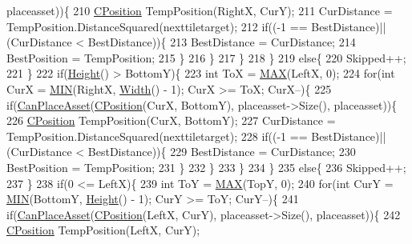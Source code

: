 \begin{DoxyCode}
      placeasset))\{
210                     \hyperlink{classCPosition}{CPosition} TempPosition(RightX, CurY);
211                     CurDistance = TempPosition.DistanceSquared(nexttiletarget);
212                     \textcolor{keywordflow}{if}((-1 == BestDistance)||(CurDistance < BestDistance))\{
213                         BestDistance = CurDistance;
214                         BestPosition = TempPosition;
215                     \}
216                 \}
217             \}
218         \}
219         \textcolor{keywordflow}{else}\{
220             Skipped++;   
221         \}
222         \textcolor{keywordflow}{if}(\hyperlink{classCTerrainMap_ae5e4bf6507e0e3e9ac0322b43eed8a7a}{Height}() > BottomY)\{
223             \textcolor{keywordtype}{int} ToX = \hyperlink{AssetDecoratedMap_8cpp_afa99ec4acc4ecb2dc3c2d05da15d0e3f}{MAX}(LeftX, 0);
224             \textcolor{keywordflow}{for}(\textcolor{keywordtype}{int} CurX = \hyperlink{AssetDecoratedMap_8cpp_a3acffbd305ee72dcd4593c0d8af64a4f}{MIN}(RightX, \hyperlink{classCTerrainMap_a34cb754aa9b26e85a73377159f2527d7}{Width}() - 1); CurX >= ToX; CurX--)\{
225                 \textcolor{keywordflow}{if}(\hyperlink{classCAssetDecoratedMap_ad4baef4b84b066847459e45205c8575c}{CanPlaceAsset}(\hyperlink{classCPosition}{CPosition}(CurX, BottomY), placeasset->Size(), 
      placeasset))\{
226                     \hyperlink{classCPosition}{CPosition} TempPosition(CurX, BottomY);
227                     CurDistance = TempPosition.DistanceSquared(nexttiletarget);
228                     \textcolor{keywordflow}{if}((-1 == BestDistance)||(CurDistance < BestDistance))\{
229                         BestDistance = CurDistance;
230                         BestPosition = TempPosition;
231                     \}
232                 \}
233             \}
234         \}
235         \textcolor{keywordflow}{else}\{
236             Skipped++;   
237         \}
238         \textcolor{keywordflow}{if}(0 <= LeftX)\{
239             \textcolor{keywordtype}{int} ToY = \hyperlink{AssetDecoratedMap_8cpp_afa99ec4acc4ecb2dc3c2d05da15d0e3f}{MAX}(TopY, 0);
240             \textcolor{keywordflow}{for}(\textcolor{keywordtype}{int} CurY = \hyperlink{AssetDecoratedMap_8cpp_a3acffbd305ee72dcd4593c0d8af64a4f}{MIN}(BottomY, \hyperlink{classCTerrainMap_ae5e4bf6507e0e3e9ac0322b43eed8a7a}{Height}() - 1); CurY >= ToY; CurY--)\{
241                 \textcolor{keywordflow}{if}(\hyperlink{classCAssetDecoratedMap_ad4baef4b84b066847459e45205c8575c}{CanPlaceAsset}(\hyperlink{classCPosition}{CPosition}(LeftX, CurY), placeasset->Size(), 
      placeasset))\{
242                     \hyperlink{classCPosition}{CPosition} TempPosition(LeftX, CurY);

\end{DoxyCode}
